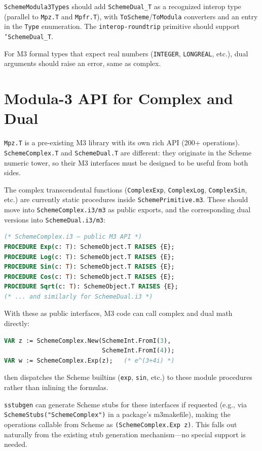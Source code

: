 \documentclass[12pt]{report}
\begin{document}
{\tt SchemeModula3Types} should add {\tt SchemeDual\_T} as a
recognized interop type (parallel to {\tt Mpz.T} and {\tt Mpfr.T}),
with {\tt ToScheme}/{\tt ToModula} converters and
an entry in the {\tt Type} enumeration.  The {\tt interop-roundtrip}
primitive should support {\tt 'SchemeDual\_T}.

For M3 formal types that expect real numbers ({\tt INTEGER},
{\tt LONGREAL}, etc.), dual arguments should raise an error,
same as complex.

\section{Modula-3 API for Complex and Dual}

{\tt Mpz.T} is a pre-existing M3 library with its own rich API
(200+ operations).  {\tt SchemeComplex.T} and {\tt SchemeDual.T}
are different: they originate in the Scheme numeric tower, so
their M3 interfaces must be designed to be useful from both sides.

The complex transcendental functions ({\tt ComplexExp},
{\tt ComplexLog}, {\tt ComplexSin}, etc.) are currently static
procedures inside {\tt SchemePrimitive.m3}.  These should move
into {\tt SchemeComplex.i3/m3} as public exports, and the
corresponding dual versions into {\tt SchemeDual.i3/m3}:

\begin{lstlisting}[language=Modula3]
(* SchemeComplex.i3 — public M3 API *)
PROCEDURE Exp(c: T): SchemeObject.T RAISES {E};
PROCEDURE Log(c: T): SchemeObject.T RAISES {E};
PROCEDURE Sin(c: T): SchemeObject.T RAISES {E};
PROCEDURE Cos(c: T): SchemeObject.T RAISES {E};
PROCEDURE Sqrt(c: T): SchemeObject.T RAISES {E};
(* ... and similarly for SchemeDual.i3 *)
\end{lstlisting}

\noindent With these as public interfaces, M3 code can call
complex and dual math directly:

\begin{lstlisting}[language=Modula3]
VAR z := SchemeComplex.New(SchemeInt.FromI(3),
                           SchemeInt.FromI(4));
VAR w := SchemeComplex.Exp(z);   (* e^(3+4i) *)
\end{lstlisting}

 then dispatches the Scheme
builtins ({\tt exp}, {\tt sin}, etc.) to these module procedures
rather than inlining the formulas.

{\tt sstubgen} can generate Scheme stubs for these interfaces
if requested (e.g., via {\tt SchemeStubs("SchemeComplex")} in
a package's m3makefile), making the operations callable from
Scheme as {\tt (SchemeComplex.Exp z)}.  This falls out naturally
from the existing stub generation mechanism---no special support
is needed.
\end{document}

